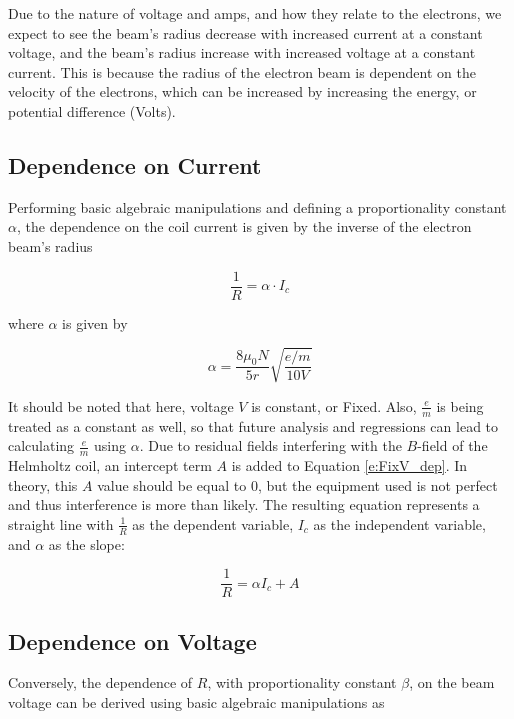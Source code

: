 \documentclass[12pt]{article}
\begin{document}
Due to the nature of voltage and amps, and how they relate to the electrons, we expect to see the beam's radius decrease with increased current at a constant voltage, and the beam's radius increase with increased voltage at a constant current. This is because the radius of the electron beam is dependent on the velocity of the electrons, which can be increased by increasing the energy, or potential difference (Volts).

\subsection{Dependence on Current}

Performing basic algebraic manipulations and defining a proportionality constant $\alpha$, the dependence on the coil current is given by the inverse of the electron beam's radius

\begin{equation}
	\frac{1}{R}=\alpha\cdot I_c \label{e:FixV_dep}
\end{equation}

\noindent where $\alpha$ is given by

\begin{equation}
	\alpha = \frac{8\mu_0N}{5r}\sqrt{\frac{e/m}{10V}} \label{e:FixV_alpha}
\end{equation}

\noindent It should be noted that here, voltage $V$ is constant, or Fixed. Also, $\frac{e}{m}$ is being treated as a constant as well, so that future analysis and regressions can lead to calculating $\frac{e}{m}$ using $\alpha$. Due to residual fields interfering with the $B$-field of the Helmholtz coil, an intercept term $A$ is added to Equation \ref{e:FixV_dep}. In theory, this $A$ value should be equal to 0, but the equipment used is not perfect and thus interference is more than likely. The resulting equation represents a straight line with $\frac{1}{R}$ as the dependent variable, $I_c$ as the independent variable, and $\alpha$ as the slope:

\begin{equation}
	\frac{1}{R}=\alpha I_c + A \label{e:FixV_linear}
\end{equation}

\subsection{Dependence on Voltage}

Conversely, the dependence of $R$, with proportionality constant $\beta$, on the beam voltage can be derived using basic algebraic manipulations as
\end{document}
